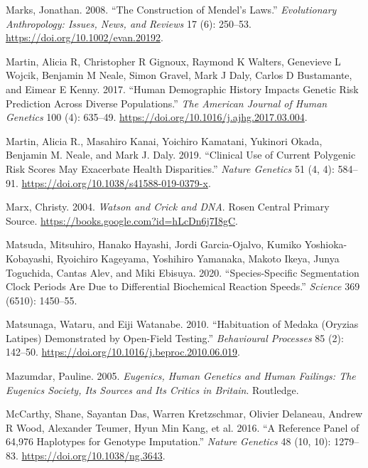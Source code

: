 \documentclass[
]{book}
\newlength{\cslhangindent}
\newlength{\cslentryspacingunit} %
\newenvironment{CSLReferences}[2] %
 {%
  \setlength{\parindent}{0pt}
  \ifodd #1
  \let\oldpar\par
  \def\par{\hangindent=\cslhangindent\oldpar}
  \fi
  \setlength{\parskip}{#2\cslentryspacingunit}
 }%
 {}
\begin{document}
\begin{CSLReferences}{1}{0}
\leavevmode{}%
Marks, Jonathan. 2008. {``The Construction of {Mendel}'s Laws.''} \emph{Evolutionary Anthropology: Issues, News, and Reviews} 17 (6): 250--53. \url{https://doi.org/10.1002/evan.20192}.

\leavevmode{}%
Martin, Alicia R, Christopher R Gignoux, Raymond K Walters, Genevieve L Wojcik, Benjamin M Neale, Simon Gravel, Mark J Daly, Carlos D Bustamante, and Eimear E Kenny. 2017. {``Human Demographic History Impacts Genetic Risk Prediction Across Diverse Populations.''} \emph{The American Journal of Human Genetics} 100 (4): 635--49. \url{https://doi.org/10.1016/j.ajhg.2017.03.004}.

\leavevmode{}%
Martin, Alicia R., Masahiro Kanai, Yoichiro Kamatani, Yukinori Okada, Benjamin M. Neale, and Mark J. Daly. 2019. {``Clinical Use of Current Polygenic Risk Scores May Exacerbate Health Disparities.''} \emph{Nature Genetics} 51 (4, 4): 584--91. \url{https://doi.org/10.1038/s41588-019-0379-x}.

\leavevmode{}%
Marx, Christy. 2004. \emph{Watson and {Crick} and {DNA}}. {Rosen Central Primary Source}. \url{https://books.google.com?id=hLcDn6j7I8gC}.

\leavevmode{}%
Matsuda, Mitsuhiro, Hanako Hayashi, Jordi Garcia-Ojalvo, Kumiko Yoshioka-Kobayashi, Ryoichiro Kageyama, Yoshihiro Yamanaka, Makoto Ikeya, Junya Toguchida, Cantas Alev, and Miki Ebisuya. 2020. {``Species-Specific Segmentation Clock Periods Are Due to Differential Biochemical Reaction Speeds.''} \emph{Science} 369 (6510): 1450--55.

\leavevmode{}%
Matsunaga, Wataru, and Eiji Watanabe. 2010. {``Habituation of Medaka ({Oryzias} Latipes) Demonstrated by Open-Field Testing.''} \emph{Behavioural Processes} 85 (2): 142--50. \url{https://doi.org/10.1016/j.beproc.2010.06.019}.

\leavevmode{}%
Mazumdar, Pauline. 2005. \emph{Eugenics, Human Genetics and Human Failings: The {Eugenics Society}, Its Sources and Its Critics in {Britain}}. {Routledge}.

\leavevmode{}%
McCarthy, Shane, Sayantan Das, Warren Kretzschmar, Olivier Delaneau, Andrew R Wood, Alexander Teumer, Hyun Min Kang, et al. 2016. {``A Reference Panel of 64,976 Haplotypes for Genotype Imputation.''} \emph{Nature Genetics} 48 (10, 10): 1279--83. \url{https://doi.org/10.1038/ng.3643}.


\end{CSLReferences}
\end{document}
